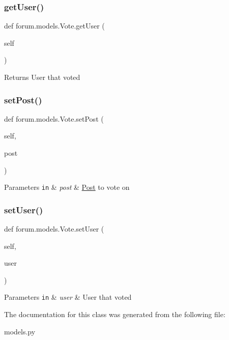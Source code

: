 \subsubsection{\texorpdfstring{get\+User()}{getUser()}}
{\footnotesize\ttfamily def forum.\+models.\+Vote.\+get\+User (\begin{DoxyParamCaption}\item[{}]{self }\end{DoxyParamCaption})}

\begin{DoxyReturn}{Returns}
User that voted 
\end{DoxyReturn}
\mbox{\label{classforum_1_1models_1_1_vote_a505b7803c6886f32fd0d1afc23f78b43}} 
\subsubsection{\texorpdfstring{set\+Post()}{setPost()}}
{\footnotesize\ttfamily def forum.\+models.\+Vote.\+set\+Post (\begin{DoxyParamCaption}\item[{}]{self,  }\item[{}]{post }\end{DoxyParamCaption})}


\begin{DoxyParams}[1]{Parameters}
\mbox{\tt in}  & {\em post} & \mbox{\hyperlink{classforum_1_1models_1_1_post}{Post}} to vote on \\
\hline
\end{DoxyParams}
\mbox{\label{classforum_1_1models_1_1_vote_a4412be7454022b6c02fb4c7056f2e7f9}} 
\subsubsection{\texorpdfstring{set\+User()}{setUser()}}
{\footnotesize\ttfamily def forum.\+models.\+Vote.\+set\+User (\begin{DoxyParamCaption}\item[{}]{self,  }\item[{}]{user }\end{DoxyParamCaption})}


\begin{DoxyParams}[1]{Parameters}
\mbox{\tt in}  & {\em user} & User that voted \\
\hline
\end{DoxyParams}


The documentation for this class was generated from the following file\+:\begin{DoxyCompactItemize}
\item 
models.\+py\end{DoxyCompactItemize}
